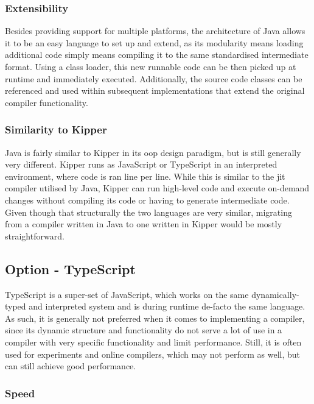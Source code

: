 \subsubsection{Extensibility}

Besides providing support for multiple platforms, the architecture of Java allows it to be an easy language to set up and extend, as its modularity means loading additional code simply means compiling it to the same standardised intermediate format. Using a class loader, this new runnable code can be then picked up at runtime and immediately executed. Additionally, the source code classes can be referenced and used within subsequent implementations that extend the original compiler functionality.

\subsubsection{Similarity to Kipper}

Java is fairly similar to Kipper in its \acrshort{oop} design paradigm, but is still generally very different. Kipper runs as JavaScript or TypeScript in an interpreted environment, where code is ran line per line. While this is similar to the \acrshort{jit} compiler utilised by Java, Kipper can run high-level code and execute on-demand changes without compiling its code or having to generate intermediate code. Given though that structurally the two languages are very similar, migrating from a compiler written in Java to one written in Kipper would be mostly straightforward.

\subsection{Option - TypeScript}
\label{sec:programming-language-option-typescript}

TypeScript is a super-set of JavaScript, which works on the same dynamically-typed and interpreted system and is during runtime de-facto the same language. As such, it is generally not preferred when it comes to implementing a compiler, since its dynamic structure and functionality do not serve a lot of use in a compiler with very specific functionality and limit performance. Still, it is often used for experiments and online compilers, which may not perform as well, but can still achieve good performance.

\subsubsection{Speed}

